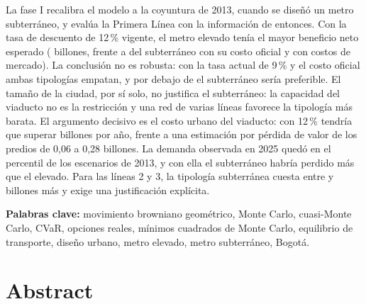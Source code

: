 La fase I recalibra el modelo a la coyuntura de 2013, cuando se diseñó un metro subterráneo, y evalúa
la Primera Línea con la información de entonces. Con la tasa de descuento de 12\,\% vigente, el metro
elevado tenía el mayor beneficio neto esperado (\BNElevDoce{} billones, frente a \BNSubOfDoce{} del
subterráneo con su costo oficial y \BNSubUnDoce{} con costos de mercado). La conclusión no es robusta:
con la tasa actual de 9\,\% y el costo oficial ambas tipologías empatan, y por debajo de \TasaEmpate{}
el subterráneo sería preferible. El tamaño de la ciudad, por sí solo, no justifica el subterráneo: la
capacidad del viaducto no es la restricción y una red de varias líneas favorece la tipología más
barata. El argumento decisivo es el costo urbano del viaducto: con 12\,\% tendría que superar
\UmbralOfDoce{} billones por año, frente a una estimación por pérdida de valor de los predios de 0,06 a
0,28 billones. La demanda observada en 2025 quedó en el percentil \PercentilObsFin{} de los escenarios
de 2013, y con ella el subterráneo habría perdido más que el elevado. Para las líneas 2 y 3, la
tipología subterránea cuesta entre \AhorroLdos{} y \AhorroLtres{} billones más y exige una
justificación explícita.

\medskip
\noindent\textbf{Palabras clave:} movimiento browniano geométrico, Monte Carlo, cuasi-Monte Carlo,
CVaR, opciones reales, mínimos cuadrados de Monte Carlo, equilibrio de transporte, diseño urbano,
metro elevado, metro subterráneo, Bogotá.

\chapter*{Abstract}

